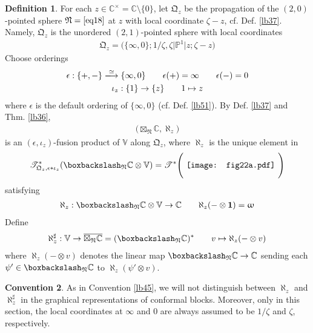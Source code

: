 \documentclass[11pt,b5paper,notitlepage]{article}
\theoremstyle{definition}
\newtheorem{df}{Definition}[section]
\newtheorem{cv}[df]{Convention}
\theoremstyle{plain}
\newcommand{\ovl}{\overline}
\newcommand{\idt}{\mathbf{1}}
\newcommand{\Vbb}{\mathbb V}
\newcommand{\Cbb}{\mathbb C}
\newcommand{\Pbb}{\mathbb P}
\newcommand{\<}{\left\langle}
\renewcommand{\>}{\right\rangle}
\newcommand{\ST}{\mathscr{T}}
\newcommand{\bbs}{\boxbackslash}
\newcommand{\fq}{{\mathfrak Q}}
\newcommand{\fn}{\mathfrak{N}}
\numberwithin{equation}{section}
\begin{document}
\begin{df}\label{lb23}
For each $z\in\Cbb^\times=\Cbb\setminus\{0\}$, let $\fq_z$ be the propagation of the $(2,0)$-pointed sphere $\fn=\eqref{eq18}$ at $z$ with local coordinate $\zeta-z$, cf. Def. \ref{lb37}. Namely, $\fq_z$ is the unordered $(2,1)$-pointed sphere with local coordinates
	\begin{align*}
\fq_z=\big(\{\infty,0\};1/\zeta,\zeta\big|\Pbb^1\big|z;\zeta-z\big)
	\end{align*}
Choose orderings
   \begin{gather*}
\epsilon:\{+,-\}\xlongrightarrow{\simeq}\{\infty,0\}\qquad \epsilon(+)=\infty\qquad \epsilon(-)=0\\
	\iota_z:\{1\}\rightarrow \{z\}\qquad 1 \mapsto z
   \end{gather*}
where $\epsilon$ is the default ordering of $\{\infty,0\}$ (cf. Def. \ref{lb51}). By Def. \ref{lb37} and Thm. \ref{lb36}, 
\begin{align*}
\big(\boxtimes_\fn\Cbb,\aleph_z\big)
\end{align*}
is an $(\epsilon,\iota_z)$-fusion product of $\Vbb$ along $\fq_z$, where $\aleph_z$ is the unique element in
\begin{align*}
\ST^*_{\fq_z,\epsilon*\iota_z}(\bbs_\fn\Cbb\otimes\Vbb)=  
		\ST^*\Bigg(\vcenter{\hbox{{
			\texttt{[image: fig22a.pdf]}}}}~\Bigg)
\end{align*}
satisfying
\begin{align}\label{eq131}
\aleph_z:\bbs_\fn\Cbb\otimes\Vbb\rightarrow\Cbb\qquad \aleph_z(-\otimes\idt)=\upomega
\end{align}
Define 
\begin{align}\label{eq79}
	\aleph_z^\sharp:\Vbb\rightarrow \ovl{\boxtimes_\fn\Cbb}=(\bbs_\fn\Cbb)^*\qquad v\mapsto\aleph_z(-\otimes v)
\end{align}
where $\aleph_z(-\otimes v)$ denotes the linear map $\bbs_\fn\Cbb\rightarrow\Cbb$ sending each $\psi'\in\bbs_\fn\Cbb$ to $\aleph_z(\psi'\otimes v)$.
\end{df}

\begin{cv}\label{lb60}
As in Convention \ref{lb45}, we will not distinguish between $\aleph_z$ and $\aleph_z^\sharp$ in the graphical representations of conformal blocks. Moreover, only in this section, the local coordinates at $\infty$ and $0$ are always assumed to be $1/\zeta$ and $\zeta$, respectively.
\end{cv}
\end{document}
